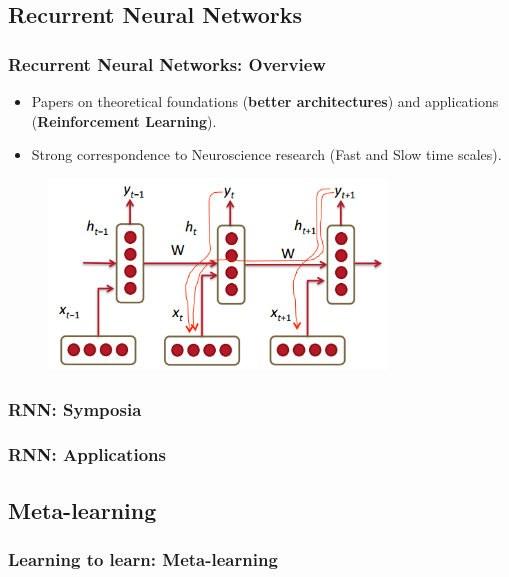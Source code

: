 \documentclass[11pt,
               hyperref={colorlinks,citecolor=pink,linkcolor=red,urlcolor=blue}
               ]{beamer}
\begin{document}
  \subsection{Recurrent Neural Networks}

  \begin{frame}
    \frametitle{Recurrent Neural Networks: Overview}

    \begin{itemize}
      \item Papers on theoretical foundations (\textbf{better architectures}\footnotemark[1]) and applications (\textbf{Reinforcement Learning}\footnotemark[2]).
      \item Strong correspondence to Neuroscience research (Fast and Slow time scales\footnotemark[3]).
    \end{itemize}

    \begin{figure}
      \centering
      \includegraphics[width=0.8\textwidth]{rnn1.png}
    \end{figure}

    \footnotetext[1]{}
  \end{frame}

  \begin{frame}
    \frametitle{RNN: Symposia}

  \end{frame}

  \begin{frame}
    \frametitle{RNN: Applications}

  \end{frame}

  \subsection{Meta-learning}

  \begin{frame}
    \frametitle{Learning to learn: Meta-learning}

  \end{frame}
\end{document}
